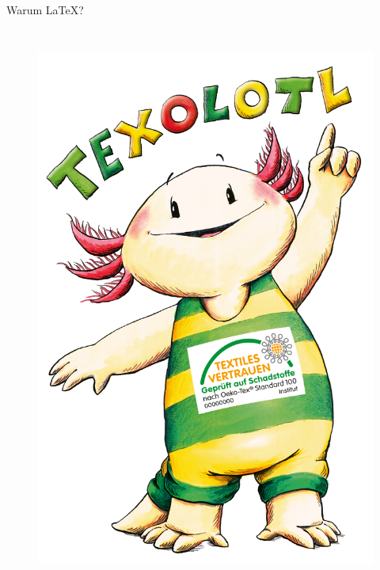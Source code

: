 \begin{frame}[c]{Warum \LaTeX?}

  \begin{columns}[t]

    \begin{figure}
      \includegraphics[width=0.6\linewidth]{img/Texolotl.jpg}      
      \footnotemark[1]
      \label{fig:texolotl}
    \end{figure}


\end{columns}
\end{frame}
